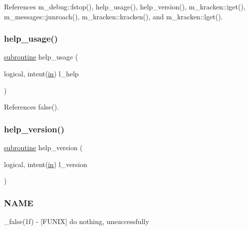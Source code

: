References m\+\_\+debug\+::fstop(), help\+\_\+usage(), help\+\_\+version(), m\+\_\+kracken\+::iget(), m\+\_\+messages\+::junroach(), m\+\_\+kracken\+::kracken(), and m\+\_\+kracken\+::lget().

\mbox{\label{__false_8f90_a3e09a3b52ee8fb04eeb93fe5761626a8}} 
\subsubsection{\texorpdfstring{help\+\_\+usage()}{help\_usage()}}
{\footnotesize\ttfamily \hyperlink{M__stopwatch_83_8txt_acfbcff50169d691ff02d4a123ed70482}{subroutine} help\+\_\+usage (\begin{DoxyParamCaption}\item[{logical, intent(\hyperlink{M__journal_83_8txt_afce72651d1eed785a2132bee863b2f38}{in})}]{l\+\_\+help }\end{DoxyParamCaption})}



References false().

\mbox{\label{__false_8f90_a39c21619b08a3c22f19e2306efd7f766}} 
\subsubsection{\texorpdfstring{help\+\_\+version()}{help\_version()}}
{\footnotesize\ttfamily \hyperlink{M__stopwatch_83_8txt_acfbcff50169d691ff02d4a123ed70482}{subroutine} help\+\_\+version (\begin{DoxyParamCaption}\item[{logical, intent(\hyperlink{M__journal_83_8txt_afce72651d1eed785a2132bee863b2f38}{in})}]{l\+\_\+version }\end{DoxyParamCaption})}



\subsubsection*{N\+A\+ME}

\+\_\+false(1f) -\/ \mbox{[}F\+U\+N\+IX\mbox{]} do nothing, unsuccessfully 


